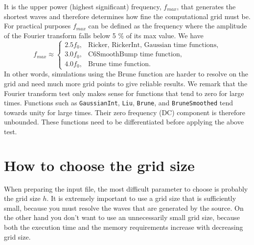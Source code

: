 \documentclass[11pt]{report}
\begin{document}
It is the upper power (highest significant) frequency, $f_{max}$, that generates the shortest waves
and therefore determines how fine the computational grid must be. For practical purposes $f_{max}$
can be defined as the frequency where the amplitude of the Fourier transform falls below 5 \% of its
max value. We have
\begin{equation}\label{eq:upper-power-freq}
f_{max} \approx \begin{cases}
2.5 f_0,&\mbox{Ricker, RickerInt, Gaussian time functions},\\
3.0 f_0,&\mbox{C6SmoothBump time function},\\
4.0 f_0,&\mbox{Brune time function}.
\end{cases}
\end{equation}
In other words, simulations using the Brune function are harder to resolve on the grid and need much
more grid points to give reliable results. We remark that the Fourier transform test only makes
sense for functions that tend to zero for large times. Functions such as {\tt GaussianInt},
{\tt Liu}, {\tt Brune}, and {\tt BruneSmoothed} tend towards unity for large times. Their zero
frequency (DC) component is therefore unbounded. These functions need to be differentiated before
applying the above test.

\chapter{How to choose the grid size} \label{sec:grid}

When preparing the input file, the most difficult parameter to choose is probably the grid size
$h$. It is extremely important to use a grid size that is sufficiently small, because you must resolve
the waves that are generated by the source. On the other hand you don't want to use an
unnecessarily small grid size, because both the execution time and the memory requirements
increase with decreasing grid size.%
\end{document}
